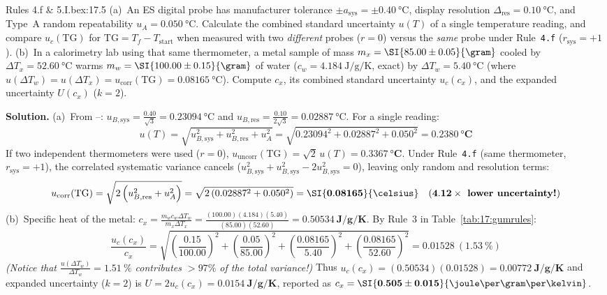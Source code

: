 \begin{workedexample}{Rules 4.f \& 5.I.b}{ex:17.5}
(a)~An ES digital probe has manufacturer tolerance $\pm a_{\mathrm{sys}} = \pm\SI{0.40}{\celsius}$, display resolution $\Delta_{\mathrm{res}} = \SI{0.10}{\celsius}$, and Type~A random repeatability $u_A = \SI{0.050}{\celsius}$. Calculate the combined standard uncertainty $u(T)$ of a single temperature reading, and compare $u_c(\mathrm{TG})$ for $\mathrm{TG} = T_f - T_{\mathrm{start}}$ when measured with two \emph{different} probes ($r=0$) versus the \emph{same} probe under Rule~\texttt{4.f} ($r_{\mathrm{sys}} = +1$).
(b)~In a calorimetry lab using that same thermometer, a metal sample of mass $m_x = \SI{85.00 \pm 0.05}{\gram}$ cooled by $\Delta T_x = \SI{52.60}{\celsius}$ warms $m_w = \SI{100.00 \pm 0.15}{\gram}$ of water ($c_w = \SI{4.184}{\joule\per\gram\per\kelvin}$, exact) by $\Delta T_w = \SI{5.40}{\celsius}$ (where $u(\Delta T_w) = u(\Delta T_x) = u_{\mathrm{corr}}(\mathrm{TG}) = \SI{0.08165}{\celsius}$). Compute $c_x$, its combined standard uncertainty $u_c(c_x)$, and the expanded uncertainty $U(c_x)$ ($k=2$).
\par\smallskip\noindent
\textbf{Solution.}
(a)~From --: $u_{B,\mathrm{sys}} = \frac{0.40}{\sqrt{3}} = \SI{0.23094}{\celsius}$ and $u_{B,\mathrm{res}} = \frac{0.10}{2\sqrt{3}} = \SI{0.02887}{\celsius}$. For a single reading:
$$u(T) = \sqrt{u_{B,\mathrm{sys}}^2 + u_{B,\mathrm{res}}^2 + u_A^2} = \sqrt{0.23094^2 + 0.02887^2 + 0.050^2} = \mathbf{\SI{0.2380}{\celsius}}$$
If two independent thermometers were used ($r = 0$), $u_{\mathrm{uncorr}}(\mathrm{TG}) = \sqrt{2}\,u(T) = \mathbf{\SI{0.3367}{\celsius}}$. Under Rule~\texttt{4.f} (same thermometer, $r_{\mathrm{sys}} = +1$), the correlated systematic variance cancels ($u_{B,\mathrm{sys}}^2 + u_{B,\mathrm{sys}}^2 - 2u_{B,\mathrm{sys}}^2 = 0$), leaving only random and resolution terms:
$$u_{\mathrm{corr}}(\mathrm{TG}) = \sqrt{2\left(u_{B,\mathrm{res}}^2 + u_A^2\right)} = \sqrt{2\left(0.02887^2 + 0.050^2\right)} = \mathbf{\SI{0.08165}{\celsius}} \quad (\mathbf{4.12\times\text{\textbf{ lower uncertainty!}}})$$
(b)~Specific heat of the metal: $c_x = \frac{m_w c_w \Delta T_w}{m_x \Delta T_x} = \frac{(100.00)(4.184)(5.40)}{(85.00)(52.60)} = \mathbf{\SI{0.50534}{\joule\per\gram\per\kelvin}}$. By Rule~3 in Table~\ref{tab:17:gumrules}:
$$\frac{u_c(c_x)}{c_x} = \sqrt{\left(\frac{0.15}{100.00}\right)^2 + \left(\frac{0.05}{85.00}\right)^2 + \left(\frac{0.08165}{5.40}\right)^2 + \left(\frac{0.08165}{52.60}\right)^2} = \mathbf{0.01528}\ (\SI{1.53}{\percent})$$
\emph{(Notice that $\frac{u(\Delta T_w)}{\Delta T_w} = \SI{1.51}{\percent}$ contributes $>97\%$ of the total variance!)} Thus $u_c(c_x) = (0.50534)(0.01528) = \mathbf{\SI{0.00772}{\joule\per\gram\per\kelvin}}$ and expanded uncertainty ($k=2$) is $U = 2 u_c(c_x) = \mathbf{\SI{0.0154}{\joule\per\gram\per\kelvin}}$, reported as $c_x = \mathbf{\SI{0.505 \pm 0.015}{\joule\per\gram\per\kelvin}}$.
\end{workedexample}

